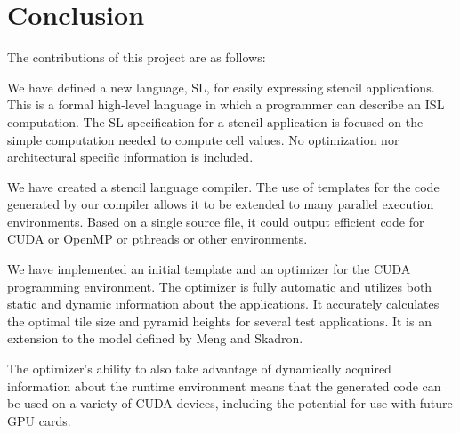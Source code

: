 \documentclass{styles/sig-alternate}
\begin{document}
\section{Conclusion}

The contributions of this project are as follows:
\begin{itemize*}
\item We have defined a new language, SL, for easily expressing
  stencil applications.  This is a formal high-level language 
  in which a programmer can describe an ISL
  computation.  The SL specification for a stencil application
  is focused on the simple computation needed to compute cell values.
  No optimization nor architectural specific information is included.
\item We have created a stencil language compiler.  
  The use of templates for the code generated by
  our compiler allows it to be extended to many
  parallel execution environments.  
  Based on a single source file, it could output efficient code for 
  CUDA or OpenMP or pthreads or other environments.
\item We have implemented an initial template and an optimizer
  for the CUDA programming environment.  The optimizer is 
  fully automatic and utilizes both static and dynamic information
  about the applications.  It accurately calculates the optimal tile size and 
  pyramid heights for several test applications.  
  It is an extension to the model defined by Meng and Skadron.
\item The optimizer's ability to also take advantage of 
  dynamically acquired information about the runtime environment
  means that the generated code can be used on a variety of CUDA
  devices, including the potential for use with future GPU cards.
\end{itemize*}


\balance


\end{document}
